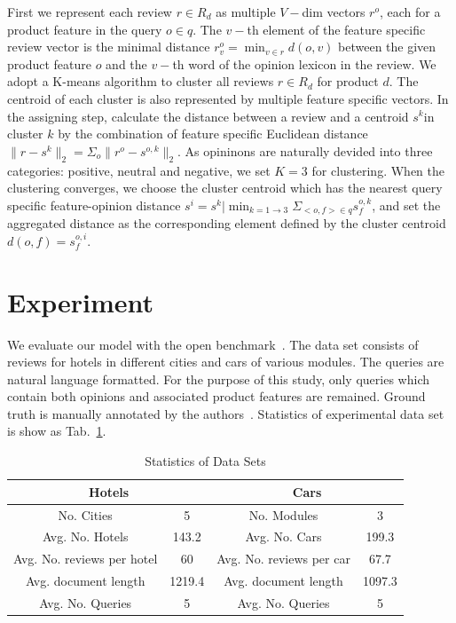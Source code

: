 \documentclass[preprint]{elsarticle}
\begin{document}
First we represent each review $r \in R_d$ as multiple $V-$dim vectors $r^o$, each for a product feature in the query $o \in q$. The $v-$th element of the feature specific review vector is the minimal distance $r^o_v = \min_{v\in r} d(o,v)$ between the given product feature $o$ and the $v-$th word of the opinion lexicon in the review. We adopt a K-means algorithm to cluster all reviews $r\in R_d$ for product $d$. The centroid of each cluster is also represented by multiple feature specific vectors. In the assigning step, calculate the distance between a review and a centroid $s^k$in cluster $k$ by the combination of feature specific Euclidean distance $\|r-s^k\|_2=\Sigma_o\|r^o-s^{o,k}\|_2$. As opininons are naturally devided into three categories: positive, neutral and negative, we set $K=3$ for clustering.  When the clustering converges, we choose the cluster centroid which has the nearest query specific feature-opinion distance $s^i=s^k|\min_{k=1 \rightarrow 3} \Sigma_{<o,f> \in q}s^{o,k}_f$, and set the aggregated distance as the corresponding element defined by the cluster centroid $d(o,f)=s^{o,i}_f$.


\section{Experiment}\label{sec:experiment}

We evaluate our model with the open benchmark~\cite{Ganesan2012Opinion}. The data set consists of reviews for hotels in different cities and cars of various modules. The queries are natural language formatted. For the purpose of this study, only queries which contain both opinions and associated product features are remained. Ground truth is manually annotated by the authors~\cite{Ganesan2012Opinion}. Statistics of experimental data set is show as Tab.~\ref{tab:data}.


\begin{table}
\small
	\centering
		\begin{tabular}{|c|c|c|c|}
		\hline
		\multicolumn{2}{|c|}{Hotels}& \multicolumn{2}{|c|}{Cars}\\\hline
			No. Cities	& 5 & No. Modules & 3 \\\hline
			Avg. No. Hotels	& 143.2 & Avg. No. Cars & 199.3 \\\hline 
			Avg. No. reviews per hotel & 60 & Avg. No. reviews per car & 67.7 \\\hline
			Avg. document length & 1219.4 & Avg. document length & 1097.3 \\\hline
			Avg. No. Queries & 5 & Avg. No. Queries & 5 \\\hline
		\end{tabular}
		\caption{Statistics of Data Sets}\label{tab:data}
\end{table}
\end{document}
